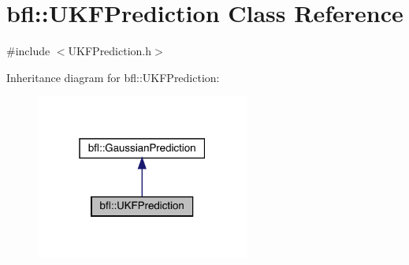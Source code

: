 \hypertarget{classbfl_1_1UKFPrediction}{}\section{bfl\+:\+:U\+K\+F\+Prediction Class Reference}
\label{classbfl_1_1UKFPrediction}


{\ttfamily \#include $<$U\+K\+F\+Prediction.\+h$>$}



Inheritance diagram for bfl\+:\+:U\+K\+F\+Prediction\+:
\nopagebreak
\begin{figure}[H]
\begin{center}
\leavevmode
\includegraphics[width=199pt]{classbfl_1_1UKFPrediction__inherit__graph}
\end{center}
\end{figure}
